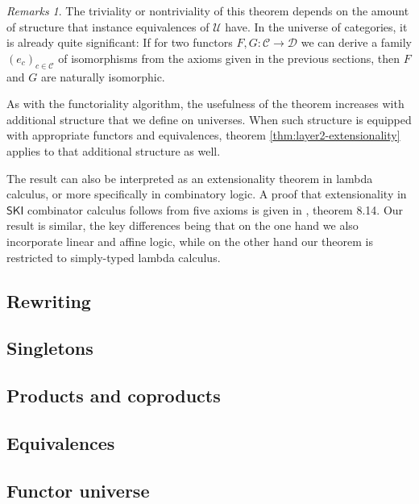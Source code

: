 \documentclass[a4paper]{article}
\theoremstyle{definition}
\theoremstyle{remark}
\newtheorem*{remarks}{Remarks}
\renewcommand{\equiv}{\simeq}
\newcommand{\C}{\mathcal{C}}
\newcommand{\D}{\mathcal{D}}
\newcommand{\U}{\mathcal{U}}
\newcommand{\V}{\mathcal{V}}
\newcommand{\nm}{\mathsf}
\begin{document}
\begin{remarks}
  The triviality or nontriviality of this theorem depends on the amount of structure
  that instance equivalences of $\U$ have. In the universe of categories, it is
  already quite significant: If for two functors $F,G : \C \to \D$ we can derive a
  family $(e_c)_{c \in \C}$ of isomorphisms from the axioms given in the previous
  sections, then $F$ and $G$ are naturally isomorphic.

  As with the functoriality algorithm, the usefulness of the theorem increases with
  additional structure that we define on universes. When such structure is equipped
  with appropriate functors and equivalences, theorem \ref{thm:layer2-extensionality}
  applies to that additional structure as well.

  The result can also be interpreted as an extensionality theorem in lambda calculus,
  or more specifically in combinatory logic. A proof that extensionality in $\nm{SKI}$
  combinator calculus follows from five axioms is given in \cite{hindley-seldin},
  theorem 8.14. Our result is similar, the key differences being that on the one hand we also
  incorporate linear and affine logic, while on the other hand our theorem is restricted to
  simply-typed lambda calculus.
\end{remarks}


\subsection{Rewriting}


\subsection{Singletons}

\subsection{Products and coproducts}

\subsection{Equivalences}

\subsection{Functor universe}
\end{document}
